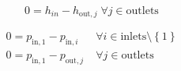 \begin{equation}
\label{eq:Splitter_energy_balance_constraints}
0=h_{in}-h_{\mathrm{out,}j}\;\forall j \in\text{outlets}
\end{equation}

\begin{equation}
\label{eq:Splitter_pressure_constraints}
\begin{split}
0 = p_\mathrm{in,1} - p_{\mathrm{in,}i} & \; \forall i \in \text{inlets} \setminus \left\lbrace 1\right\rbrace\\
0 = p_\mathrm{in,1} - p_{\mathrm{out,}j} & \; \forall j \in \text{outlets}\\
\end{split}
\end{equation}


